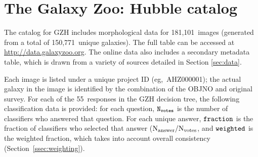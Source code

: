 \documentclass[twocolumn]{aastex6}
\begin{document}
%
%
%
%
%
%
%

\section{The Galaxy Zoo: Hubble catalog}\label{sec:results}

The catalog for GZH includes morphological data for 181,101~images
(generated from a total of 150,771~unique galaxies). The full table can be
accessed at \url{http://data.galaxyzoo.org}. The online data also includes a
secondary metadata table, which is drawn from a variety of sources detailed in
Section \ref{sec:data}.

Each image is listed under a unique project ID (eg,~AHZ000001); the actual
galaxy in the image is identified by the combination of the OBJNO and original
survey. For each of the 55~responses in the GZH decision tree, the following
classification data is provided: for each question, $\tt N_{votes}$ is the
number of classifiers who answered that question. For each unique answer, $\tt fraction$
is the fraction of classifiers who selected that answer ($\rm N_{answer}/N_{votes}$, and
$\tt weighted$ is the weighted fraction, which takes into account overall
consistency (Section~\ref{ssec:weighting}). 
\end{document}
